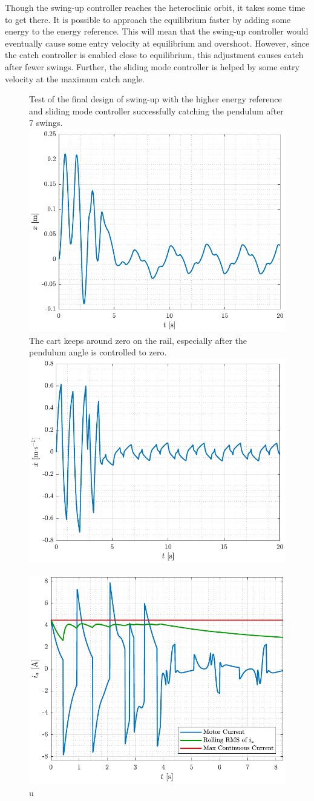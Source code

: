 Though the swing-up controller reaches the heteroclinic orbit, it takes some time to get there. It is possible to approach the equilibrium faster by adding some energy to the energy reference. This will mean that the swing-up controller would eventually cause some entry velocity at equilibrium and overshoot. However, since the catch controller is enabled close to equilibrium, this adjustment causes catch after fewer swings. Further, the sliding mode controller is helped by some entry velocity at the maximum catch angle.

\begin{figure}[H]
  \hspace{-10pt}
  \captionbox
  {
    Test of the final design of swing-up with the higher energy reference and sliding mode controller successfully catching the pendulum after 7 swings.
    \label{fig:swingAndCatch_test_theta}
  }
  {
    \hspace{-1cm}
    \includegraphics[width=.4\textwidth]{figures/x_4_conX}
  }
  \hspace{20pt}
  \captionbox 
  {
    The cart keeps around zero on the rail, especially after the pendulum angle is controlled to zero.
    \label{fig:swingAndCatch_test_x}
  }
  {
    \hspace{-1cm}
    \includegraphics[width=.4\textwidth]{figures/xDot_4_conX}
  }  
\end{figure}

\begin{figure}[H]
  \includegraphics[width=.42\textwidth]{figures/ia_4_conX}
  \caption{ u  }
  \label{fig:swingAndCatch_test_u}
\end{figure}

